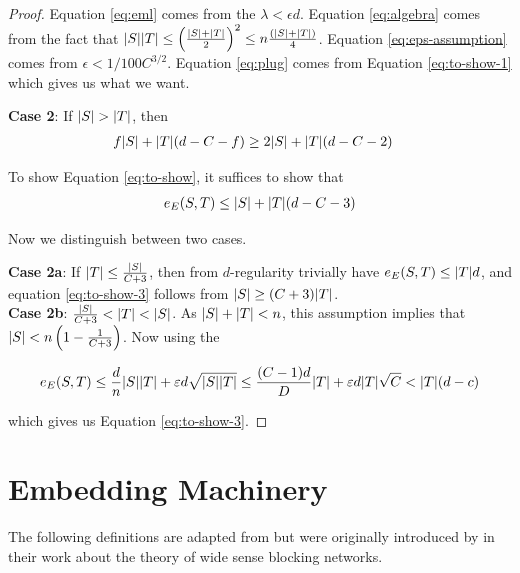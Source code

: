\documentclass[11pt]{article}
\begin{document}
\begin{proof}
Equation \eqref{eq:eml} comes from the  $\lambda < \epsilon d$.
Equation \eqref{eq:algebra} comes from the fact that $\Size{S}\Size{T} \leq \left(\frac{\Size{S}+\Size{T}}{2}\right)^2 \le n\frac{(\Size{S}+\Size{T})}{4}$.
Equation \eqref{eq:eps-assumption} comes from $\epsilon < 1/100C^{3/2}$.
Equation \eqref{eq:plug} comes from Equation \eqref{eq:to-show-1} which gives us what we want.

\textbf{Case 2}: If $\Size{S} > \Size{T}$, then 
  \begin{align}
    f\Size{S} +  \Size{T}(d-C-f)  &\ge 2\Size{S} +\Size{T}(d-C-2) \label{eq:to-show-2}
  \end{align}
  
  To show Equation \eqref{eq:to-show}, it suffices to show that
\begin{align}
  \CutEdges{S}{T}{E} \leq \Size{S} + \Size{T}(d-C-3) \label{eq:to-show-3}
\end{align}

Now we distinguish between two cases.

\textbf{Case 2a}: If $\Size{T} \le \frac{\Size{S}}{C+3}$, then from $d$-regularity trivially have $\CutEdges{S}{T}{E} \leq \Size{T}d$, and equation \eqref{eq:to-show-3} follows from $\Size{S} \geq (C+3)\Size{T}$. \\

\textbf{Case 2b}: $ \frac{\Size{S}}{C+3} < \Size{T} < \Size{S}$. As $\Size{S} + \Size{T} < n$, this assumption implies that $\Size{S} < n\left(1 - \frac{1}{C+3}\right)$.
Now using the 

\[ \CutEdges{S}{T}{E} \le \frac{d}{n}\Size{S}\Size{T} + \epsilon d \sqrt{\Size{S}\Size{T}} \le \frac{(C-1)d}{D}\Size{T} + \epsilon d \Size{T}\sqrt{C} < \Size{T}(d-c)\]

which gives us Equation \eqref{eq:to-show-3}.

\end{proof}  

\section{Embedding Machinery}
\label{sec:embed-machinery}

The following definitions are adapted from \citep{nenadov2023routing} but were originally introduced by \citet{feldman1988wide} in their work about the theory of wide sense blocking networks.
\end{document}
